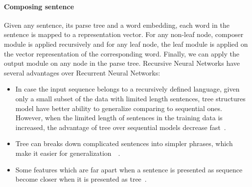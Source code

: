 \paragraph{Composing sentence}
Given any sentence, its parse tree and a word embedding, each word in the sentence is mapped to a representation vector.
For any non-leaf node, composer module is applied recursively and for any leaf node, the leaf module is applied on the vector representation of the corresponding word.
Finally, we can apply the output module on any node in the parse tree.
Recursive Neural Networks have several advantages over Recurrent Neural Networks:
\begin{itemize}
	\item In case the input sequence belongs to a recursively defined language, given only a small subset of the data with limited length sentences, tree structures model have better ability to generalize comparing to sequential ones.
	However, when the limited length of sentences in the training data is increased, the advantage of tree over sequential models decrease fast~\cite{bowman-treevslstm}.
	\item Tree can breaks down complicated sentences into simpler phrases, which make it easier for generalization~\cite{knowledge-matter}~\cite{need-tree}.
	\item Some features which are far apart when a sentence is presented as sequence become closer when it is presented as tree~\cite{need-tree}.
\end{itemize}
